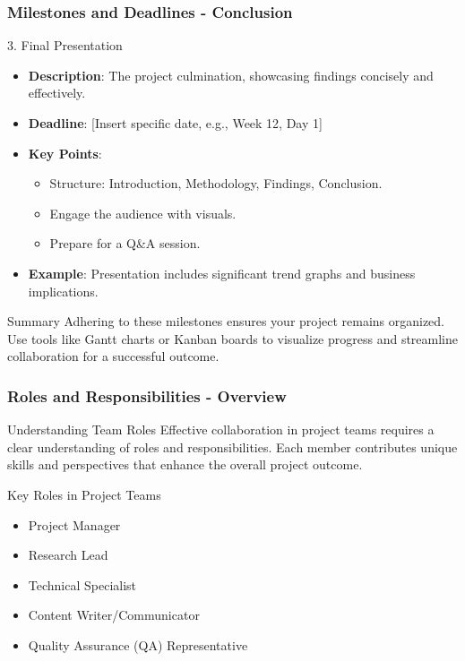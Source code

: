\documentclass[aspectratio=169]{beamer}
\begin{document}
\begin{frame}[fragile]
    \frametitle{Milestones and Deadlines - Conclusion}
    \begin{block}{3. Final Presentation}
        \begin{itemize}
            \item \textbf{Description}: The project culmination, showcasing findings concisely and effectively.
            \item \textbf{Deadline}: [Insert specific date, e.g., Week 12, Day 1]
            \item \textbf{Key Points}:
            \begin{itemize}
                \item Structure: Introduction, Methodology, Findings, Conclusion.
                \item Engage the audience with visuals.
                \item Prepare for a Q\&A session.
            \end{itemize}
            \item \textbf{Example}: Presentation includes significant trend graphs and business implications.
        \end{itemize}
    \end{block}
    \pause
    \begin{block}{Summary}
        Adhering to these milestones ensures your project remains organized. 
        Use tools like Gantt charts or Kanban boards to visualize progress and streamline collaboration for a successful outcome.
    \end{block}
\end{frame}

\begin{frame}[fragile]
    \frametitle{Roles and Responsibilities - Overview}
    \begin{block}{Understanding Team Roles}
        Effective collaboration in project teams requires a clear understanding of roles and responsibilities. Each member contributes unique skills and perspectives that enhance the overall project outcome.
    \end{block}
    \begin{block}{Key Roles in Project Teams}
        \begin{itemize}
            \item Project Manager
            \item Research Lead
            \item Technical Specialist
            \item Content Writer/Communicator
            \item Quality Assurance (QA) Representative
        \end{itemize}
    \end{block}
    
\end{frame}
\end{document}
